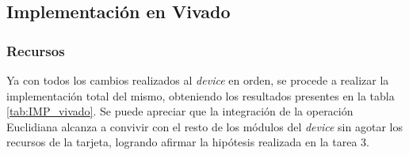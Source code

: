 \documentclass[conference]{IEEEtran}
\begin{document}



\subsection{Implementación en Vivado}

\subsubsection{Recursos}
Ya con todos los cambios realizados al \textit{device} en orden, se procede a realizar la implementación total del mismo, obteniendo los resultados presentes en la tabla \ref{tab:IMP_vivado}. Se puede apreciar que la integración de la operación Euclidiana alcanza a convivir con el resto de los módulos del \textit{device} sin agotar los recursos de la tarjeta, logrando afirmar la hipótesis realizada en la tarea 3. 
\end{document}
